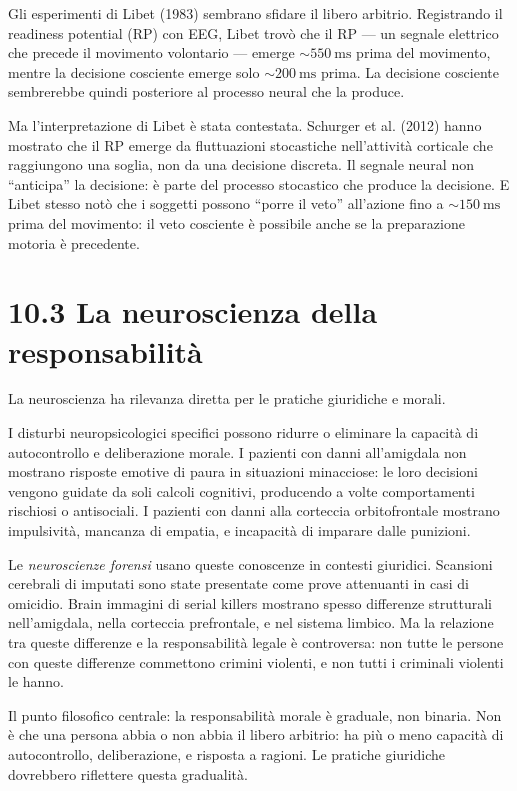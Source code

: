 \documentclass[11.5pt,a4paper,openany]{book}
\theoremstyle{remark}
\begin{document}
Gli esperimenti di Libet (1983) sembrano sfidare il libero arbitrio. Registrando il readiness potential (RP) con EEG, Libet trovò che il RP --- un segnale elettrico che precede il movimento volontario --- emerge $\sim 550\ \text{ms}$ prima del movimento, mentre la decisione cosciente emerge solo $\sim 200\ \text{ms}$ prima. La decisione cosciente sembrerebbe quindi posteriore al processo neural che la produce.

Ma l'interpretazione di Libet è stata contestata. Schurger et al. (2012) hanno mostrato che il RP emerge da fluttuazioni stocastiche nell'attività corticale che raggiungono una soglia, non da una decisione discreta. Il segnale neural non ``anticipa'' la decisione: è parte del processo stocastico che produce la decisione. E Libet stesso notò che i soggetti possono ``porre il veto'' all'azione fino a $\sim 150\ \text{ms}$ prima del movimento: il veto cosciente è possibile anche se la preparazione motoria è precedente.

\section{10.3 La neuroscienza della responsabilità}

La neuroscienza ha rilevanza diretta per le pratiche giuridiche e morali.

I disturbi neuropsicologici specifici possono ridurre o eliminare la capacità di autocontrollo e deliberazione morale. I pazienti con danni all'amigdala non mostrano risposte emotive di paura in situazioni minacciose: le loro decisioni vengono guidate da soli calcoli cognitivi, producendo a volte comportamenti rischiosi o antisociali. I pazienti con danni alla corteccia orbitofrontale mostrano impulsività, mancanza di empatia, e incapacità di imparare dalle punizioni.

Le \textit{neuroscienze forensi} usano queste conoscenze in contesti giuridici. Scansioni cerebrali di imputati sono state presentate come prove attenuanti in casi di omicidio. Brain immagini di serial killers mostrano spesso differenze strutturali nell'amigdala, nella corteccia prefrontale, e nel sistema limbico. Ma la relazione tra queste differenze e la responsabilità legale è controversa: non tutte le persone con queste differenze commettono crimini violenti, e non tutti i criminali violenti le hanno.

Il punto filosofico centrale: la responsabilità morale è graduale, non binaria. Non è che una persona abbia o non abbia il libero arbitrio: ha più o meno capacità di autocontrollo, deliberazione, e risposta a ragioni. Le pratiche giuridiche dovrebbero riflettere questa gradualità.
\end{document}
